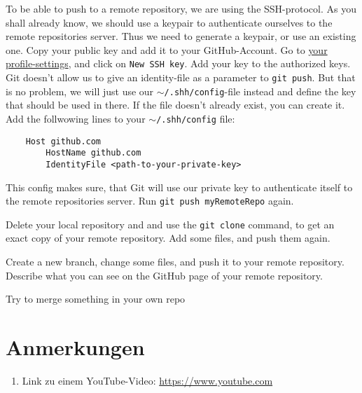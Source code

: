 \documentclass{dcbl/challenge}
\begin{document}
\begin{aufgabe}
    To be able to push to a remote repository, we are using the SSH-protocol.
    As you shall already know, we should use a keypair to authenticate ourselves to the remote repositories server.
    Thus we need to generate a keypair, or use an existing one.
    Copy your public key and add it to your GitHub-Account.
    Go to \href{https://github.com/settings/keys}{your profile-settings}, and click on \texttt{New SSH key}.
    Add your key to the authorized keys.
    Git doesn't allow us to give an identity-file as a parameter to \texttt{git push}.
    But that is no problem, we will just use our \texttt{$\sim$/.shh/config}-file instead and define the key that should be used in there.
    If the file doesn't already exist, you can create it.
    Add the follwowing lines to your \texttt{$\sim$/.shh/config} file:
    \begin{lstlisting}
    Host github.com
        HostName github.com
        IdentityFile <path-to-your-private-key>
    \end{lstlisting}
    This config makes sure, that Git will use our private key to authenticate itself to the remote repositories server.
    Run \texttt{git push myRemoteRepo} again.
\end{aufgabe}

\begin{aufgabe}
    Delete your local repository and and use the \texttt{git clone} command, to get an exact copy of your remote repository.
    Add some files, and push them again. 
\end{aufgabe}

\begin{aufgabe}
    Create a new branch, change some files, and push it to your remote repository.
    Describe what you can see on the GitHub page of your remote repository.
\end{aufgabe}

\begin{aufgabe}
    Try to merge something in your own repo
\end{aufgabe}

\section*{Anmerkungen}
\begin{enumerate}
    \item Link zu einem YouTube-Video: \url{https://www.youtube.com}
\end{enumerate}
\end{document}
